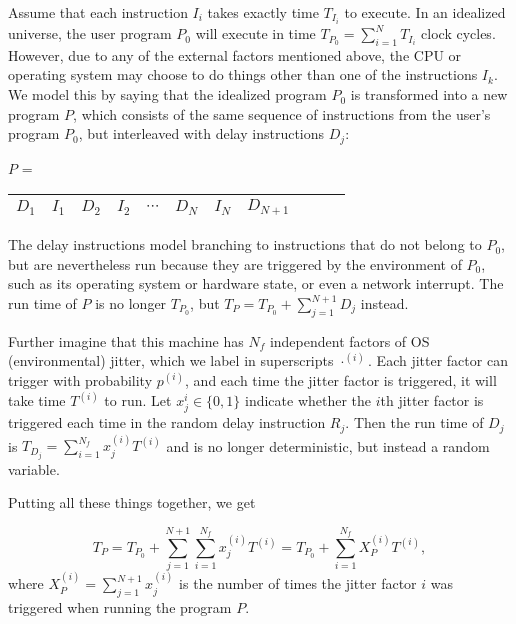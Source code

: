 \documentclass[conference]{IEEEtran}
\begin{document}
Assume that each instruction $I_i$ takes exactly time $T_{I_i}$ to execute.
In an idealized universe, the user program $P_0$ will execute in time $T_{P_0} = \sum_{i=1}^N T_{I_i}$ clock cycles. However, due to any of the external factors mentioned above, the CPU or operating system may choose to do things other than one of the instructions $I_k$. We model this by saying that the idealized program $P_0$ is transformed into a new program $P$, which consists of the same sequence of instructions from the user's program $P_0$, but interleaved with delay instructions $D_j$:

$P$ = \begin{tabular}{|c|c|c|c|c|c|c|c|c|c|c|}
\hline
$D_1$ & $I_1$ & $D_2$ & $I_2$ &
$\cdots$ & $D_N$ & $I_N$ & $D_{N+1}$
\tabularnewline
\hline
\end{tabular}

The delay instructions model branching to instructions that do not belong to $P_0$, but are nevertheless run because they are triggered by the environment of $P_0$, such as its operating system or hardware state, or even a network interrupt. The run time of $P$ is no longer $T_{P_0}$, but
$T_P = T_{P_0} + \sum_{j=1}^{N+1} D_j$ instead.

Further imagine that this machine has $N_f$ independent factors of OS (environmental) jitter, which we label in superscripts $\cdot^{(i)}$. Each jitter factor can trigger with probability $p^{(i)}$, and each time the jitter factor is triggered, it will take time $T^{(i)}$ to run. Let $x^{i}_j \in \{0, 1\}$ indicate whether the $i$th jitter factor is triggered each time in the random delay instruction $R_j$. Then the run time of $D_j$ is
$T_{D_j} = \sum_{i=1}^{N_f} x^{(i)}_j T^{(i)}$ and is no longer deterministic, but instead a random variable.

Putting all these things together, we get

\begin{equation}
T_P = T_{P_0} + \sum_{j=1}^{N+1} \sum_{i=1}^{N_f} x^{(i)}_j T^{(i)}
= T_{P_0} + \sum_{i=1}^{N_f} X_P^{(i)} T^{(i)},
\end{equation}
%
where $X_P^{(i)} = \sum_{j=1}^{N+1} x^{(i)}_j$ is the number of times the jitter factor $i$ was triggered when running the program $P$.
\end{document}

